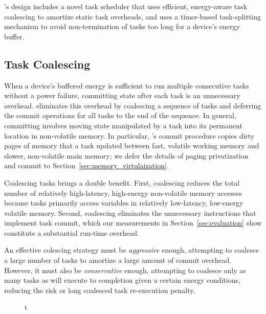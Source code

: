 \sys's design includes a novel task scheduler that uses efficient,
energy-aware task coalescing to amortize static task overheads, and uses a timer-based
task-splitting mechanism to avoid non-termination of tasks too long
for a device's energy buffer. 
% 
\subsection{Task Coalescing}
\label{sec:task_coalescing}
% 
When a device's buffered energy is sufficient to run multiple consecutive tasks
without a power failure, committing state after each task is an unnecessary
overhead. \sys eliminates this overhead by coalescing a sequence of tasks and deferring the commit
operations for all tasks to the end of the sequence. 
In general, committing involves moving state manipulated by a task
into its permanent location in non-volatile memory.  In particular, \sys's
commit procedure copies dirty pages of memory that a task updated between fast,
volatile working memory and slower, non-volatile main memory; we defer the
details of paging privatization and commit to Section~\ref{sec:memory_virtulaization}.

Coalescing tasks brings a double benefit. First, coalescing reduces the total number of relatively
high-latency, high-energy non-volatile memory accesses because tasks primarily
access variables in relatively low-latency, low-energy volatile memory.
Second, coalescing eliminates the unnecessary instructions that implement task
commit, which our measurements in Section~\ref{sec:evaluation} show constitute
a substantial run-time overhead.

An effective colescing strategy must be {\em aggressive} enough, attempting to coalesce a
large number of tasks to amortize a large amount of commit overhead. However, it must also be 
{\em conservative} enough, attempting to coalesce only as many tasks as will execute
to completion given a certain energy conditions, reducing the risk or long coalesced task re-execution penalty. 

%
\begin{figure}{t}
\end{figure}
% 
